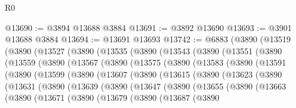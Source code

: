 \begin{lexlean}{R0}
\begin{coremodule}
@13690 := @3894 @13688 @3884
@13691 := @3892 @13690
@13693 := @3901 @13688 @3884
@13694 := @13691 @13693
@13742 := @6883
    (@3890
      (@13519
        (@3890
          (@13527
            (@3890
              (@13535
                (@3890
                  (@13543
                    (@3890
                      (@13551
                        (@3890
                          (@13559
                            (@3890
                              (@13567
                                (@3890
                                  (@13575
                                    (@3890
                                      (@13583
                                        (@3890
                                          (@13591
                                            (@3890
                                              (@13599
                                                (@3890
                                                  (@13607
                                                    (@3890
                                                      (@13615
                                                        (@3890
                                                          (@13623
                                                            (@3890
                                                              (@13631
                                                                (@3890
                                                                  (@13639
                                                                    (@3890
                                                                      (@13647
                                                                        (@3890
                                                                          (@13655
                                                                            (@3890
                                                                              (@13663
                                                                                (@3890
                                                                                  (@13671
                                                                                    (@3890
                                                                                      (@13679
                                                                                        (@3890
                                                                                          (@13687
                                                                                            (@3890

\end{coremodule}
\end{lexlean}
